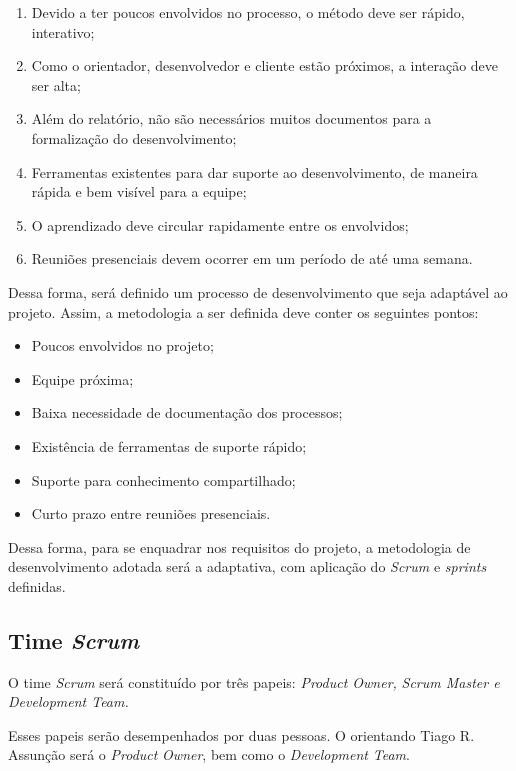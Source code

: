 \begin{enumerate}
    \item Devido a ter poucos envolvidos no processo, o método deve ser rápido, interativo;
    \item Como o orientador, desenvolvedor e cliente estão próximos, a interação deve ser alta;
    \item Além do relatório, não são necessários muitos documentos para a formalização do desenvolvimento;
    \item Ferramentas existentes para dar suporte ao desenvolvimento, de maneira rápida e bem visível para a equipe;
    \item O aprendizado deve circular rapidamente entre os envolvidos;
    \item Reuniões presenciais devem ocorrer em um período de até uma semana.
\end{enumerate}

Dessa forma, será definido um processo de desenvolvimento que seja adaptável
ao projeto. Assim, a metodologia a ser definida deve conter os seguintes pontos:

\begin{itemize}
        \item Poucos  envolvidos no projeto;
        \item Equipe próxima;
        \item Baixa necessidade de documentação dos processos;
        \item Existência de ferramentas de suporte rápido;
        \item Suporte para conhecimento compartilhado;
        \item Curto prazo entre reuniões presenciais.
\end{itemize}

Dessa forma, para se enquadrar nos requisitos do projeto, a metodologia de desenvolvimento
adotada será a adaptativa, com aplicação do \textit{Scrum} e \textit{sprints} definidas.

\subsection{Time \textit{Scrum}}
\label{subsec:timescrum}
O time \textit{Scrum} será constituído por três papeis: \textit{Product Owner,} \textit{Scrum Master e Development Team.}

Esses papeis serão desempenhados por duas pessoas. O orientando Tiago R. Assunção será o \textit{Product}
\textit{Owner}, bem como o \textit{Development} \textit{Team}.


